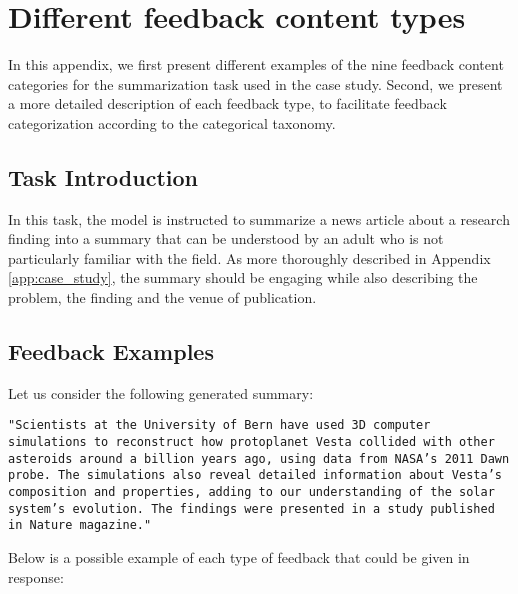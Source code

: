\section{Different feedback content types}
\label{app:feedback_examples}

In this appendix, we first present different examples of the nine feedback content categories for the summarization task used in the case study. Second, we present a more detailed description of each feedback type, to facilitate feedback categorization according to the categorical taxonomy.

\subsection{Task Introduction}
In this task, the model is instructed to summarize a news article about a research finding into a summary that can be understood by an adult who is not particularly familiar with the field. As more thoroughly described in Appendix \ref{app:case_study}, the summary should be engaging while also describing the problem, the finding and the venue of publication.

\subsection{Feedback Examples}
\label{app:categorial_examples}

Let us consider the following generated summary: 

\texttt{"Scientists at the University of Bern have used 3D computer simulations to reconstruct how protoplanet Vesta collided with other asteroids around a billion years ago, using data from NASA's 2011 Dawn probe. The simulations also reveal detailed information about Vesta's composition and properties, adding to our understanding of the solar system's evolution. The findings were presented in a study published in Nature magazine."}

Below is a possible example of each type of feedback that could be given in response:

